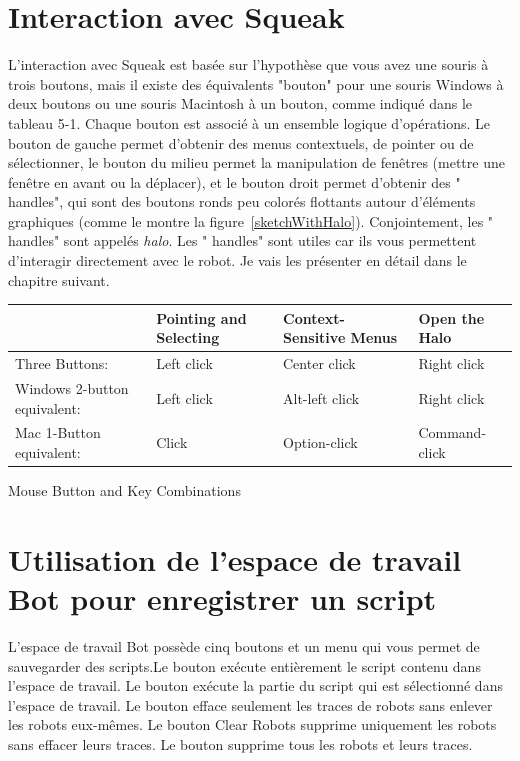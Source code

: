 \documentclass[a4paper,10pt,twoside]{book}
\begin{document}
\section{Interaction avec Squeak }

L'interaction avec Squeak est bas\'ee sur l'hypoth\`ese que vous avez une souris \`a trois boutons, mais il existe des \'equivalents "bouton" pour une souris Windows  \`a deux boutons ou une souris Macintosh \`a un bouton, comme indiqu\'e dans le tableau 5-1. Chaque bouton est associ\'e \`a un ensemble logique d'op\'erations. Le bouton de gauche permet d'obtenir des menus contextuels, de pointer ou de s\'electionner, le bouton du milieu permet la manipulation de fen\^etres (mettre une fen\^etre en avant ou la d\'eplacer), et le bouton droit permet d'obtenir des " handles", qui sont des boutons ronds peu color\'es flottants autour d'\'el\'ements graphiques (comme le montre la figure~\ref{sketchWithHalo}). Conjointement, les " handles" sont appel\'es \emph{halo}.  Les " handles" sont utiles car ils vous permettent d'interagir directement avec le robot. Je vais les pr\'esenter en d\'etail dans le chapitre suivant. 

\noindent
\setlength{\extrarowheight}{1mm}
{\small \begin{tabular}{p{22mm}p{25mm}p{25mm}p{25mm}}
\hline
&\textbf{\textsf{Pointing and Selecting}}&\textbf{\textsf{Context-Sensitive Menus}}&\textbf{\textsf{Open the Halo}}\\ \hline
Three Buttons:&Left click&Center click&Right click\\ 
Windows 2-button equivalent: &Left click &Alt-left click&Right click\\ 
Mac 1-Button equivalent:&Click&Option-click&Command-click\\ \hline
\end{tabular}}
Mouse Button and Key Combinations 



\section{Utilisation de l'espace de travail Bot pour enregistrer un script }

L'espace de travail Bot poss\`ede cinq boutons et un menu qui vous permet de sauvegarder des scripts.Le bouton  ex\'ecute enti\`erement  le script contenu dans l'espace de travail. Le bouton  ex\'ecute la partie du script qui est  s\'electionn\'e dans l'espace de travail. Le bouton  efface seulement les traces de robots sans enlever les robots eux-m\^emes. Le bouton Clear Robots supprime uniquement les robots sans effacer leurs traces. Le bouton  supprime tous les robots et leurs traces. 
\end{document}
